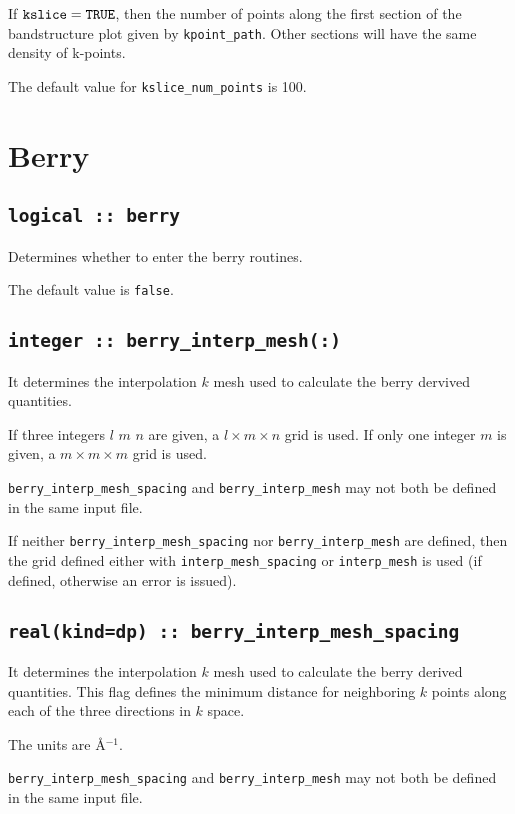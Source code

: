 If $\verb#kslice#=\verb#TRUE#$, then the number of points along
the first section of the bandstructure plot given by
\verb#kpoint_path#. Other sections will have the same density of
k-points. 

The default value for \verb#kslice_num_points# is 100.


\clearpage
\section{Berry}

\subsection[berry]{\tt logical :: berry}
Determines whether to enter the berry routines.

The default value is \verb#false#.

\subsection[berry\_interp\_mesh]{\tt integer :: berry\_interp\_mesh(:)}
It determines the interpolation $k$ mesh used to calculate the berry
dervived quantities.

If three integers $l$ $m$ $n$ are given, a $l\times m\times n$ grid is used. If only one integer $m$ is given, a $m\times m\times m$ grid is used.

{\tt berry\_interp\_mesh\_spacing} and  {\tt berry\_interp\_mesh} may not both be defined in the same input file.

If neither {\tt berry\_interp\_mesh\_spacing} nor  {\tt berry\_interp\_mesh} are defined, then the grid defined either with {\tt interp\_mesh\_spacing} or {\tt interp\_mesh} is used (if defined, otherwise an error is issued).

\subsection[berry\_interp\_mesh\_spacing]{\tt real(kind=dp) :: berry\_interp\_mesh\_spacing}
It determines the interpolation $k$ mesh used to calculate the berry
derived quantities. This flag
defines the minimum distance for neighboring $k$ points along each of
the three directions in $k$ space. 


The units are \AA$^{-1}$.

{\tt berry\_interp\_mesh\_spacing} and  {\tt berry\_interp\_mesh} may not both be defined in the same input file.

